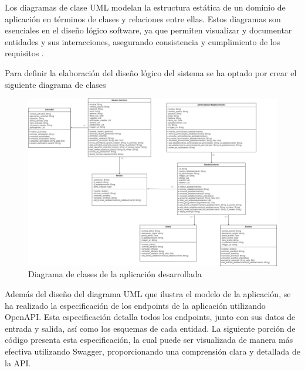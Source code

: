 Los diagramas de clase UML modelan la estructura estática de un dominio de aplicación en términos de clases y relaciones entre ellas. Estos diagramas son esenciales en el diseño lógico software, ya que permiten visualizar y documentar entidades y sus interacciones, asegurando consistencia y cumplimiento de los requisitos \cite{berardi}.

Para definir la elaboración del diseño lógico del sistema se ha optado por crear el siguiente diagrama de clases

\begin{figure}[H]
    \centering
    \includegraphics[width=\textwidth]{imagenes/DiagramaHangOut.jpg}
    \caption{Diagrama de clases de la aplicación desarrollada}
    \label{fig:DiagramaHangOut}
\end{figure}

Además del diseño del diagrama UML que ilustra el modelo de la aplicación, se ha realizado la especificación de los endpoints de la aplicación utilizando OpenAPI. Esta especificación detalla todos los endpoints, junto con sus datos de entrada y salida, así como los esquemas de cada entidad. La siguiente porción de código presenta esta especificación, la cual puede ser visualizada de manera más efectiva utilizando Swagger, proporcionando una comprensión clara y detallada de la API.


